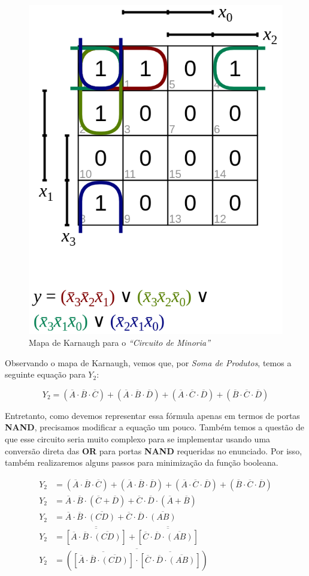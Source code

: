 \documentclass[12pt]{article}
\begin{document}
\begin{figure}[H]
    \centering
    \includegraphics[width=.5\textwidth]{Exp03/2_2_karnaugh_map.png}
    \caption{Mapa de Karnaugh para o \textit{``Circuito de Minoria''}}\label{fig:2_2_karnaugh_map.png}
\end{figure}

Observando o mapa de Karnaugh, vemos que, por \textit{Soma de Produtos}, temos a
seguinte equação para \(Y_{2}\):

\begin{equation}
  Y_{2} = (\overline{A} \cdot \overline{B} \cdot \overline{C}) + (\overline{A} \cdot \overline{B} \cdot \overline{D}) + (\overline{A} \cdot \overline{C} \cdot \overline{D}) + (\overline{B} \cdot \overline{C} \cdot \overline{D})
\end{equation}

Entretanto, como devemos representar essa fórmula apenas em termos de portas
\textbf{NAND}, precisamos modificar a equação um pouco. Também temos a questão
de que esse circuito seria muito complexo para se implementar usando uma
conversão direta das \textbf{OR} para portas \textbf{NAND} requeridas no
enunciado. Por isso, também realizaremos alguns passos para minimização da
função booleana.

\begin{align}
  Y_{2} &= (\overline{A} \cdot \overline{B} \cdot \overline{C}) + (\overline{A} \cdot \overline{B} \cdot \overline{D}) + (\overline{A} \cdot \overline{C} \cdot \overline{D}) + (\overline{B} \cdot \overline{C} \cdot \overline{D})\\
  Y_{2} &= \overline{A}\cdot \overline{B} \cdot (\overline{C} + \overline{D}) + \overline{C} \cdot \overline{D} \cdot (\overline{A} + \overline{B})\\
  Y_{2} &= \overline{A}\cdot\overline{B} \cdot \overline{(CD)} + \overline{C}\cdot\overline{D} \cdot \overline{(AB)}\\
  Y_{2} &= \overline{\overline{ \left[ \overline{A}\cdot\overline{B} \cdot \overline{(CD)} \right] }} + \overline{\overline{ \left[ \overline{C}\cdot\overline{D} \cdot \overline{(AB)} \right] }}\\
  Y_{2} &= \overline{ \left( \overline{ \left[ \overline{A}\cdot\overline{B} \cdot \overline{(CD)} \right] } \cdot  \overline{ \left[ \overline{C}\cdot\overline{D} \cdot \overline{(AB)} \right] } \right)} \label{eq:2.2_NAND}
\end{align}
\end{document}
